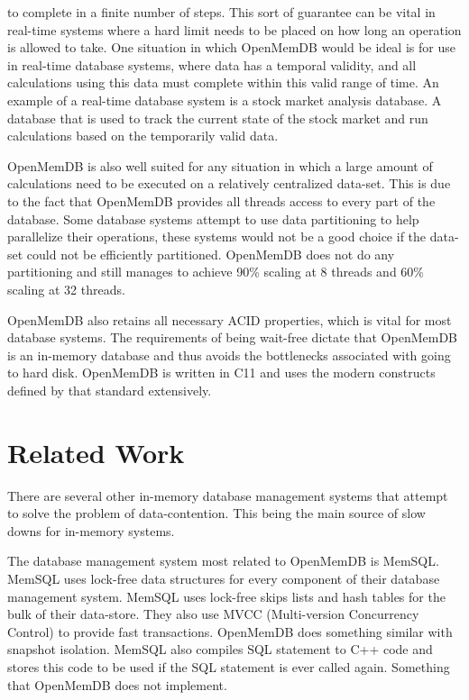 \documentclass[conference, compsoc]{IEEEtran}
\newcommand{\CC}{C\nolinebreak\hspace{-.05em}\raisebox{.4ex}{\tiny\bf +}\nolinebreak\hspace{-.10em}\raisebox{.4ex}{\tiny\bf +}}
\begin{document}
to complete in a finite number of steps. This sort of guarantee can be vital in 
real-time systems where a hard limit needs to be placed on how long an operation 
is allowed to take. One situation in which OpenMemDB would be ideal is for use in real-time 
database systems, where data has a temporal validity, and all calculations using this data 
must complete within this valid range of time. An example of a real-time database system 
is a stock market analysis database. A database that is used to track the current state
of the stock market and run calculations based on the temporarily valid data. 
\par\vspace{\baselineskip}
OpenMemDB
is also well suited for any situation in which a large amount of calculations need to be 
executed on a relatively centralized data-set. This is due to the fact that OpenMemDB 
provides all threads access to every part of the database. Some database systems attempt to 
use data partitioning to help parallelize their operations, these systems would not be a 
good choice if the data-set could not be efficiently partitioned. OpenMemDB does not do any 
partitioning and still manages to achieve 90\% scaling at 8 threads and 60\% scaling at 32 
threads. 
\par\vspace{\baselineskip}
OpenMemDB also retains all necessary ACID properties, which is vital for most database systems. 
The requirements of being wait-free dictate that 
OpenMemDB is an in-memory database and thus avoids the bottlenecks associated with 
going to hard disk. OpenMemDB is written in \CC 11 and uses the modern constructs defined by 
that standard extensively.
\par\vspace{\baselineskip}

\section{Related Work}
There are several other in-memory database management systems that attempt to solve the 
problem of data-contention. This being the main source of slow downs for in-memory systems.

The database management system most related to OpenMemDB is MemSQL.
MemSQL uses lock-free data structures for every component of their database management
system. MemSQL uses lock-free skips lists and hash tables for the bulk of their data-store\cite{MemSQL}.
They also use MVCC (Multi-version Concurrency Control) to provide fast transactions. 
OpenMemDB does something similar with snapshot isolation. MemSQL also compiles SQL
statement to C++ code and stores this code to be used if the SQL statement is ever called
again. Something that OpenMemDB does not implement.
\end{document}
